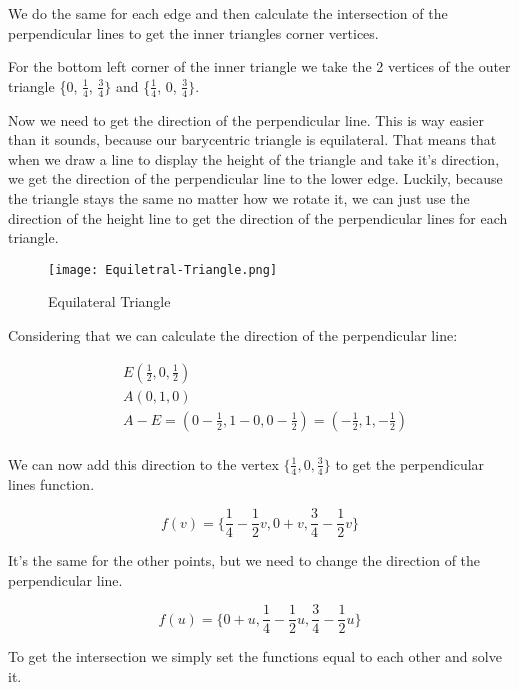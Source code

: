 \documentclass[12pt]{report} \usepackage{preamble}
\begin{document}
We do the same for each edge and then calculate the intersection of the
perpendicular lines to get the inner triangles corner vertices.

For the bottom left corner of the inner triangle we take the
2 vertices of the outer triangle \{0, \(\frac{1}{4}\), \(\frac{3}{4}\}\)
and \{\(\frac{1}{4}\), 0, \(\frac{3}{4}\}\).

Now we need to get the direction of the perpendicular line.
This is way easier than it sounds, because our barycentric triangle is equilateral.
That means that when we draw a line to display the height of the triangle and take it's direction,
we get the direction of the perpendicular line to the lower edge.
Luckily, because the triangle stays the same no matter how we rotate it, we can just use
the direction of the height line to get the direction of the
perpendicular lines for each triangle. \cite{equilateral-triangle}

\begin{figure}[htbp]
	\centering \texttt{[image: Equiletral-Triangle.png]}
	\caption{Equilateral Triangle}
	\cite{equilateral-triangle}
\end{figure} \FloatBarrier

Considering that we can calculate the direction of the perpendicular line:

\[
	\begin{aligned}
		 & E(\frac{1}{2}, 0, \frac{1}{2})                                                      \\
		 & A(0, 1, 0)                                                                          \\
		 & A - E = (0 - \frac{1}{2}, 1 - 0, 0 - \frac{1}{2}) = (-\frac{1}{2}, 1, -\frac{1}{2}) \\
	\end{aligned}
\]

We can now add this direction to the vertex \(\{\frac{1}{4}, 0, \frac{3}{4}\}\)
to get the perpendicular lines function.

\[
	f(v) = \{\frac{1}{4} - \frac{1}{2}v, 0 + v, \frac{3}{4} - \frac{1}{2}v\}
\]

It's the same for the other points, but we need to change the direction of the perpendicular line.

\[
	f(u) = \{0+u, \frac{1}{4} - \frac{1}{2}u, \frac{3}{4} - \frac{1}{2}u\}
\]

To get the intersection we simply set the functions equal to each other and solve it.
\end{document}
